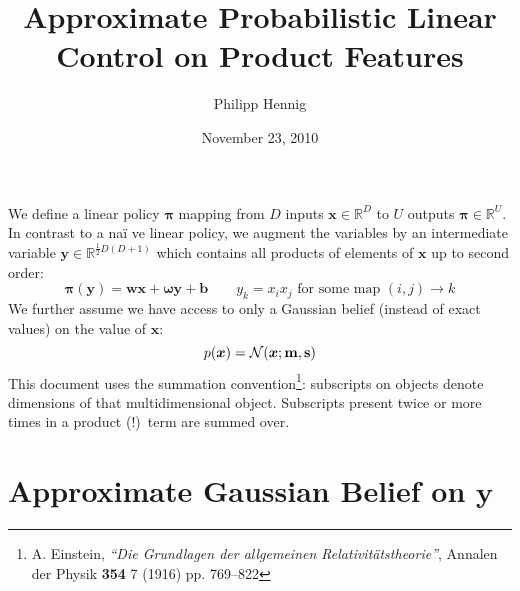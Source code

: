 \documentclass[a4paper]{article}
\title{Approximate Probabilistic Linear Control on Product Features}
\author{Philipp Hennig}
\date{November 23, 2010}
\newcommand{\bfm}{{\bf m}}
\newcommand{\bfs}{{\bf s}}
\newcommand{\N}{\mathcal{N}}
\renewcommand{\vec}[1]{\boldsymbol{#1}}
\newcommand{\mat}[1]{\boldsymbol{#1}}
\renewcommand{\Re}{\mathbb{R}}
\newcommand{\bfx}{\vec{x}}
\newcommand{\bfy}{\vec{y}}
\newcommand{\bfpi}{\vec{\pi}}
\newcommand{\bfw}{\mat{w}}
\newcommand{\bfom}{\mat{\omega}}
\newcommand{\<}{\langle}
\renewcommand{\>}{\rangle}
\begin{document}
\maketitle

We define a linear policy $\bfpi$ mapping from $D$ inputs
$\bfx\in\Re^D$ to $U$ outputs $\bfpi\in\Re^{U}$. In contrast to a
na\"i ve linear policy, we augment the variables by an intermediate
variable $\bfy\in\Re^{\frac{1}{2}D(D+1)}$ which contains all products
of elements of $\bfx$ up to second order:
\begin{equation}
  \label{eq:1}
  \bfpi(\bfy) = \bfw \bfx + \bfom \bfy + \vec{b} \qquad y_k = x_i x_j
  \text{ for some map }  (i,j) \to k
\end{equation}
We further assume we have access to only a Gaussian belief (instead of
exact values) on the value of $\bfx$:
\begin{equation}
  \label{eq:2}
  p(\bfx) = \N(\bfx;\bfm,\bfs)
\end{equation}
This document uses the summation convention\footnote{A. Einstein,
  \emph{``Die Grundlagen der allgemeinen Relativit\"atstheorie''},
  Annalen der Physik \textbf{354} 7 (1916) pp. 769--822}: subscripts on objects
denote dimensions of that multidimensional object. Subscripts present
twice or more times in a product (!)\ term are summed over. 

\section*{Approximate Gaussian Belief on $\bfy$}
\label{sec:belief-bfy}
\end{document}
